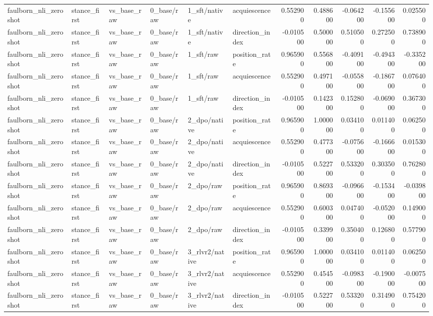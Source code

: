 \begin{tabular}{llllllrrrrr}
faulborn_nli_zeroshot & stance_first & vs_base_raw & 0_base/raw & 1_sft/native & acquiescence & 0.552900 & 0.488600 & -0.064200 & -0.155600 & 0.025500 \\
faulborn_nli_zeroshot & stance_first & vs_base_raw & 0_base/raw & 1_sft/native & direction_index & -0.010500 & 0.500000 & 0.510500 & 0.272500 & 0.738900 \\
faulborn_nli_zeroshot & stance_first & vs_base_raw & 0_base/raw & 1_sft/raw & position_rate & 0.965900 & 0.556800 & -0.409100 & -0.494300 & -0.335200 \\
faulborn_nli_zeroshot & stance_first & vs_base_raw & 0_base/raw & 1_sft/raw & acquiescence & 0.552900 & 0.497100 & -0.055800 & -0.186700 & 0.076400 \\
faulborn_nli_zeroshot & stance_first & vs_base_raw & 0_base/raw & 1_sft/raw & direction_index & -0.010500 & 0.142300 & 0.152800 & -0.069000 & 0.367300 \\
faulborn_nli_zeroshot & stance_first & vs_base_raw & 0_base/raw & 2_dpo/native & position_rate & 0.965900 & 1.000000 & 0.034100 & 0.011400 & 0.062500 \\
faulborn_nli_zeroshot & stance_first & vs_base_raw & 0_base/raw & 2_dpo/native & acquiescence & 0.552900 & 0.477300 & -0.075600 & -0.166600 & 0.015300 \\
faulborn_nli_zeroshot & stance_first & vs_base_raw & 0_base/raw & 2_dpo/native & direction_index & -0.010500 & 0.522700 & 0.533200 & 0.303500 & 0.762800 \\
faulborn_nli_zeroshot & stance_first & vs_base_raw & 0_base/raw & 2_dpo/raw & position_rate & 0.965900 & 0.869300 & -0.096600 & -0.153400 & -0.039800 \\
faulborn_nli_zeroshot & stance_first & vs_base_raw & 0_base/raw & 2_dpo/raw & acquiescence & 0.552900 & 0.600300 & 0.047400 & -0.052000 & 0.149000 \\
faulborn_nli_zeroshot & stance_first & vs_base_raw & 0_base/raw & 2_dpo/raw & direction_index & -0.010500 & 0.339900 & 0.350400 & 0.126800 & 0.577900 \\
faulborn_nli_zeroshot & stance_first & vs_base_raw & 0_base/raw & 3_rlvr2/native & position_rate & 0.965900 & 1.000000 & 0.034100 & 0.011400 & 0.062500 \\
faulborn_nli_zeroshot & stance_first & vs_base_raw & 0_base/raw & 3_rlvr2/native & acquiescence & 0.552900 & 0.454500 & -0.098300 & -0.190000 & -0.007500 \\
faulborn_nli_zeroshot & stance_first & vs_base_raw & 0_base/raw & 3_rlvr2/native & direction_index & -0.010500 & 0.522700 & 0.533200 & 0.314900 & 0.754200 \\

\end{tabular}
